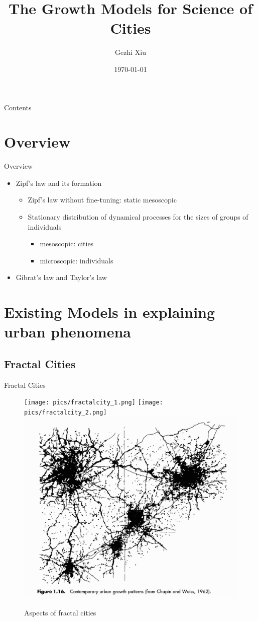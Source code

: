 \documentclass{beamer}
\title[Growth Models]{The Growth Models for Science of Cities}
\author[G. Xiu]{Gezhi Xiu} %
\institute[IRSGIS PKU]{Complexity Research Group,\\Peking University}
\date[\today]{\today}
\begin{document}
\maketitle
\begin{frame}{Contents}
\tableofcontents
\end{frame}
\section{Overview}
\begin{frame}{Overview}
  \begin{itemize}
    \item Zipf's law and its formation
    \begin{itemize}
      \item Zipf's law without fine-tuning: static mesoscopic
      \item Stationary distribution of dynamical processes for the sizes of groups of individuals
      \begin{itemize}
        \item mesoscopic: cities
        \item microscopic: individuals
      \end{itemize}
    \end{itemize}
    \item Gibrat's law and Taylor's law
  \end{itemize}
\end{frame}

\section{Existing Models in explaining urban phenomena}

\subsection{Fractal Cities}

\begin{frame}{Fractal Cities}

  \begin{figure}
    \texttt{[image: pics/fractalcity\_1.png]}
    \texttt{[image: pics/fractalcity\_2.png]}
    \includegraphics[width = 0.3\linewidth]{pics/fractalcity_3.png}
    \caption{Aspects of fractal cities}
  \end{figure}
\end{frame}
\end{document}
